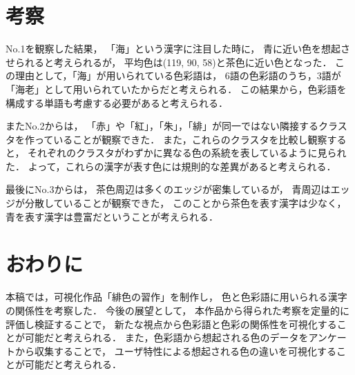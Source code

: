 \documentclass[a4j,twocolumn]{ujarticle} %
\newcommand{\workname}{緋色の習作}
\newcommand{\colorname}{色彩語}
\newcommand{\mysection}[1]{\vspace{-20pt}\section{#1}}
\begin{document}
\mysection{考察}
\label{consideration}

No.1を観察した結果，
「海」という漢字に注目した時に，
青に近い色を想起させられると考えられるが，
平均色は(119, 90, 58)と茶色に近い色となった．
この理由として，「海」が用いられている\colorname{}は，
6語の\colorname{}のうち，3語が「海老」として用いられていたからだと考えられる．
この結果から，\colorname{}を構成する単語も考慮する必要があると考えられる．

またNo.2からは，
「赤」や「紅」，「朱」，「緋」が同一ではない隣接するクラスタを作っていることが観察できた．
また，これらのクラスタを比較し観察すると，
それぞれのクラスタがわずかに異なる色の系統を表しているように見られた．
よって，これらの漢字が表す色には規則的な差異があると考えられる．

最後にNo.3からは，
茶色周辺は多くのエッジが密集しているが，
青周辺はエッジが分散していることが観察できた，
このことから茶色を表す漢字は少なく，青を表す漢字は豊富だということが考えられる．

\mysection{おわりに}

本稿では，可視化作品「\workname{}」を制作し，
色と\colorname{}に用いられる漢字の関係性を考察した．
今後の展望として，
本作品から得られた考察を定量的に評価し検証することで，
新たな視点から\colorname{}と色彩の関係性を可視化することが可能だと考えられる．
また，\colorname{}から想起される色のデータをアンケートから収集することで，
ユーザ特性による想起される色の違いを可視化することが可能だと考えられる．

\vspace{-2zh}




\end{document}
